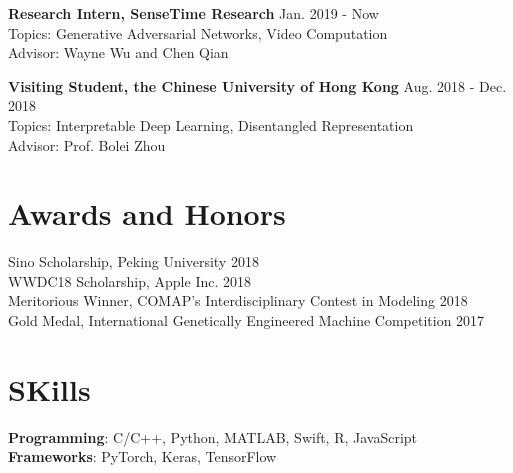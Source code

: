 \documentclass{academiccv}
\begin{document}
\textbf{Research Intern, SenseTime Research} \hfill Jan. 2019 - Now  \\
Topics: Generative Adversarial Networks, Video Computation \\
Advisor: Wayne Wu and Chen Qian \newline

\textbf{Visiting Student, the Chinese University of Hong Kong} \hfill Aug. 2018 - Dec. 2018  \\
Topics: Interpretable Deep Learning, Disentangled Representation \\
Advisor: Prof. Bolei Zhou \\

\section*{Awards and Honors}


Sino Scholarship, Peking University \hfill 2018  \\
WWDC18 Scholarship, Apple Inc. \hfill 2018  \\
Meritorious Winner, COMAP's Interdisciplinary Contest in Modeling \hfill 2018  \\
Gold Medal, International Genetically Engineered Machine Competition 
\hfill 2017  \\


\section*{SKills}
\textbf{Programming}: C/C++, Python, MATLAB, Swift, R, JavaScript\\
\textbf{Frameworks}: PyTorch, Keras, TensorFlow\\


\end{document}
